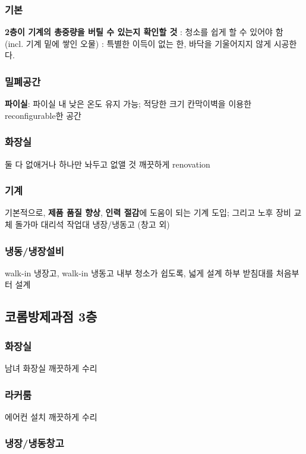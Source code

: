 \documentclass{myproc}
\begin{document}
\subsubsection{기본}
\bit
\w \textcolor{red2}{\bf{}2층이 기계의 총중량을 버틸 수 있는지 확인할 것}
\w {}: 청소를 쉽게 할 수 있어야 함  (incl. 기계 밑에 쌓인 오물)
\w {}: 특별한 이득이 없는 한, 바닥을 기울어지지 않게 시공한다. 
\eit

\subsubsection{밀폐공간}
\bit
\w \textcolor{blue2}{\bf{}파이실}: 파이실 내 낮은 온도 유지 가능; 적당한 크기
\w 칸막이벽을 이용한 reconfigurable한 공간
\eit

\subsubsection{화장실}
\bit
\w 둘 다 없애거나 하나만 놔두고 없앨 것
\w 깨끗하게 renovation
\eit


\subsubsection{기계}
\bit
\w 기본적으로, \textcolor{red2}{\bf 제품 품질 향상}, \textcolor{red2}{\bf 인력
  절감}에 도움이 되는 기계 도입; 그리고 노후 장비 교체
\w 돌가마
\w 대리석 작업대
\w 냉장/냉동고 (창고 외)
\eit

\subsubsection{냉동/냉장설비}
\bit
\w walk-in 냉장고, walk-in 냉동고
\w 내부 청소가 쉽도록, 넓게 설계
\w 하부 받침대를 처음부터 설계
\eit

\subsection{코롬방제과점 3층}
\subsubsection{화장실}
\bit
\w 남녀 화장실 깨끗하게 수리
\eit
\subsubsection{라커룸}
\bit
\w 에어컨 설치
\w 깨끗하게 수리
\eit

\subsubsection{냉장/냉동창고}
\end{document}
